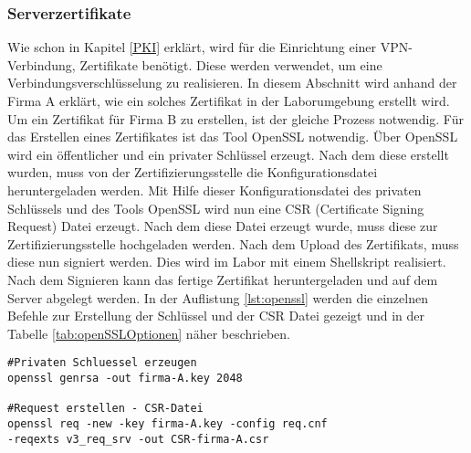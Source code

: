 \subsubsection{Serverzertifikate}
Wie schon in Kapitel \ref{PKI} erklärt, wird für die Einrichtung einer VPN-Verbindung, Zertifikate benötigt. Diese werden verwendet, um eine Verbindungsverschlüsselung zu realisieren. In diesem Abschnitt wird anhand der Firma A erklärt, wie ein solches Zertifikat in der Laborumgebung erstellt wird. Um ein Zertifikat für Firma B zu erstellen, ist der gleiche Prozess notwendig. \newline
Für das Erstellen eines Zertifikates ist das Tool OpenSSL notwendig. Über OpenSSL wird ein öffentlicher und ein privater Schlüssel erzeugt. Nach dem diese erstellt wurden, muss von der Zertifizierungsstelle die Konfigurationsdatei heruntergeladen werden. Mit Hilfe dieser Konfigurationsdatei des privaten Schlüssels und des Tools OpenSSL wird nun eine CSR (Certificate Signing Request) Datei erzeugt. Nach dem diese Datei erzeugt wurde, muss diese zur Zertifizierungsstelle hochgeladen werden. Nach dem Upload des Zertifikats, muss diese nun signiert werden. Dies wird im Labor mit einem Shellskript realisiert. Nach dem Signieren kann das fertige Zertifikat heruntergeladen und auf dem Server 
abgelegt werden. In der Auflistung \ref{lst:openssl}  werden die einzelnen Befehle zur Erstellung der Schlüssel und der CSR Datei gezeigt und in der Tabelle \ref{tab:openSSLOptionen} näher beschrieben.\newline
\lstset{
	basicstyle=\footnotesize, frame=tb,
	xleftmargin=.2\textwidth, xrightmargin=.2\textwidth
}
\begin{lstlisting}[caption={Erzeugen eines privaten Schlüssels mit OpenSSL},label=lst:openssl]
#Privaten Schluessel erzeugen
openssl genrsa -out firma-A.key 2048

#Request erstellen - CSR-Datei
openssl req -new -key firma-A.key -config req.cnf 
-reqexts v3_req_srv -out CSR-firma-A.csr
\end{lstlisting}
\vspace{\baselineskip}
